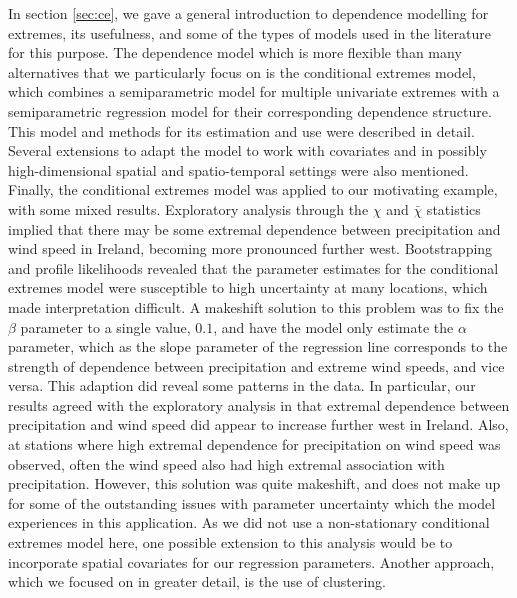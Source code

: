 \documentclass{article}
\numberwithin{equation}{section}
\begin{document}
In section \ref{sec:ce}, we gave a general introduction to dependence modelling for extremes, its usefulness, and some of the types of models used in the literature for this purpose. 
The dependence model which is more flexible than many alternatives that we particularly focus on is the conditional extremes model, which combines a semiparametric model for multiple univariate extremes with a semiparametric regression model for their corresponding dependence structure.
This model and methods for its estimation and use were described in detail. 
Several extensions to adapt the model to work with covariates and in possibly high-dimensional spatial and spatio-temporal settings were also mentioned. 
Finally, the conditional extremes model was applied to our motivating example, with some mixed results. 
Exploratory analysis through the $\chi$ and $\bar{\chi}$ statistics implied that there may be some extremal dependence between precipitation and wind speed in Ireland, becoming more pronounced further west.
Bootstrapping and profile likelihoods revealed that the parameter estimates for the conditional extremes model were susceptible to high uncertainty at many locations, which made interpretation difficult. 
A makeshift solution to this problem was to fix the $\beta$ parameter to a single value, $0.1$, and have the model only estimate the $\alpha$ parameter, which as the slope parameter of the regression line corresponds to the strength of dependence between precipitation and extreme wind speeds, and vice versa.
This adaption did reveal some patterns in the data.
In particular, our results agreed with the exploratory analysis in that extremal dependence between precipitation and wind speed did appear to increase further west in Ireland. 
Also, at stations where high extremal dependence for precipitation on wind speed was observed, often the wind speed also had high extremal association with precipitation. 
However, this solution was quite makeshift, and does not make up for some of the outstanding issues with parameter uncertainty which the model experiences in this application. 
As we did not use a non-stationary conditional extremes model here, one possible extension to this analysis would be to incorporate spatial covariates for our regression parameters. 
Another approach, which we focused on in greater detail, is the use of clustering.
\end{document}
